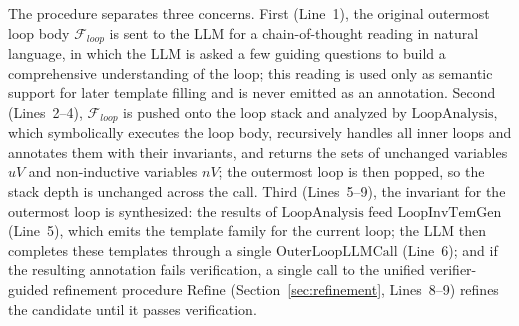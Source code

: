 \DIFaddbegin
The procedure separates three concerns.
First (Line~1), the original outermost loop body $\mathcal{F}_{\textit{loop}}$ is sent to the LLM for a chain-of-thought reading in natural language, in which the LLM is asked a few guiding questions to build a comprehensive understanding of the loop; this reading is used only as semantic support for later template filling and is never emitted as an annotation.
Second (Lines~2--4), $\mathcal{F}_{\textit{loop}}$ is pushed onto the loop stack and analyzed by $\mathrm{LoopAnalysis}$, which symbolically executes the loop body, recursively handles all inner loops and annotates them with their invariants, and returns the sets of unchanged variables $\textit{uV}$ and non-inductive variables $\textit{nV}$; the outermost loop is then popped, so the stack depth is unchanged across the call.
Third (Lines~5--9), the invariant for the outermost loop is synthesized: the results of $\mathrm{LoopAnalysis}$ feed $\mathrm{LoopInvTemGen}$ (Line~5), which emits the template family for the current loop; the LLM then completes these templates through a single $\mathrm{OuterLoopLLMCall}$ (Line~6); and if the resulting annotation fails verification, a single call to the unified verifier-guided refinement procedure $\mathrm{Refine}$ (Section~\ref{sec:refinement}, Lines~8--9) refines the candidate until it passes verification.
\DIFaddend

 

    
    
    
   

    

